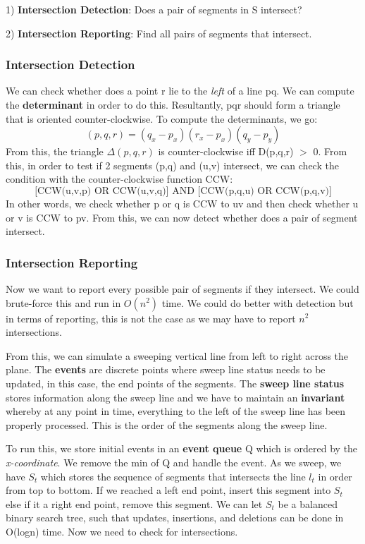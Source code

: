 \documentclass[11pt, oneside]{article}
\theoremstyle{definition}
\begin{document}
1) \textbf{Intersection Detection}: Does a pair of segments in S intersect?

2) \textbf{Intersection Reporting}: Find all pairs of segments that intersect.

\subsubsection{Intersection Detection}
We can check whether does a point r lie to the \textit{left} of a line pq. We can compute the \textbf{determinant} in order to do this. Resultantly, pqr should form a triangle that is oriented counter-clockwise. To compute the determinants, we go:
$$
(p,q,r) = (q_x - p_x)(r_x - p_x)(q_y - p_y)
$$
From this, the triangle $\Delta(p,q,r)$ is counter-clockwise iff D(p,q,r) $>$ 0. From this, in order to test if 2 segments (p,q) and (u,v) intersect, we can check the condition with the counter-clockwise function CCW:
$$
\text{[CCW(u,v,p) OR CCW(u,v,q)] AND [CCW(p,q,u) OR CCW(p,q,v)]}
$$
In other words, we check whether p or q is CCW to uv and then check whether u or v is CCW to pv. From this, we can now detect whether does a pair of segment intersect.

\subsubsection{Intersection Reporting}
Now we want to report every possible pair of segments if they intersect. We could brute-force this and run in $O(n^2)$ time. We could do better with detection but in terms of reporting, this is not the case as we may have to report $n^2$ intersections.

From this, we can simulate a sweeping vertical line from left to right across the plane. The \textbf{events} are discrete points where sweep line status needs to be updated, in this case, the end points of the segments. The \textbf{sweep line status} stores information along the sweep line and we have to maintain an \textbf{invariant} whereby at any point in time, everything to the left of the sweep line has been properly processed. This is the order of the segments along the sweep line.

To run this, we store initial events in an \textbf{event queue} Q which is ordered by the \textit{x-coordinate}. We remove the min of Q and handle the event. As we sweep, we have $S_t$ which stores the sequence of segments that intersects the line $l_t$ in order from top to bottom. If we reached a left end point, insert this segment into $S_t$ else if it a right end point, remove this segment. We can let $S_t$ be a balanced binary search tree, such that updates, insertions, and deletions can be done in O(logn) time. Now we need to check for intersections.
\end{document}
